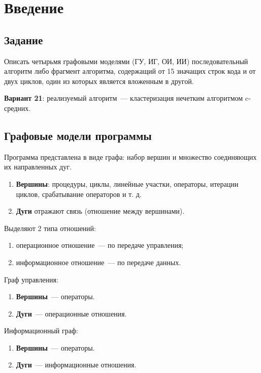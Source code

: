 \chapter{Введение}

\section{Задание}

Описать четырьмя графовыми моделями (ГУ, ИГ, ОИ, ИИ) последовательный алгоритм либо фрагмент алгоритма, содержащий от 15 значащих строк кода и от двух циклов, один из которых является вложенным в другой.

\textbf{Вариант 21}: реализуемый алгоритм~--- кластеризация нечетким алгоритмом c-средних.

\section{Графовые модели программы}

Программа представлена в виде графа: набор вершин и множество соединяющих их направленных дуг.

\begin{enumerate}
    \item \textbf{Вершины}: процедуры, циклы, линейные участки, операторы, итерации циклов, срабатывание операторов и т. д.
    \item \textbf{Дуги} отражают связь (отношение между вершинами). 
\end{enumerate}

Выделяют 2 типа отношений:
\begin{enumerate}
    \item операционное отношение~--- по передаче управления;
    \item информационное отношение~--- по передаче данных.
\end{enumerate}

Граф управления:
\begin{enumerate}
    \item \textbf{Вершины}~--- операторы.
    \item \textbf{Дуги}~--- операционные отношения.
\end{enumerate}

Информационный граф:
\begin{enumerate}
    \item \textbf{Вершины}~--- операторы.
    \item \textbf{Дуги}~--- информационные отношения.
\end{enumerate}

